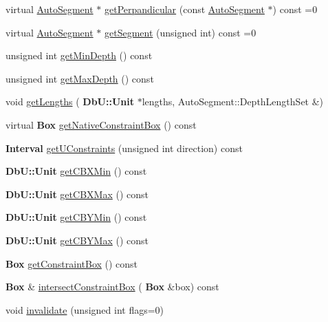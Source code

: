 \begin{DoxyCompactItemize}
\item 
virtual \hyperlink{classKatabatic_1_1AutoSegment}{Auto\+Segment} $\ast$ \hyperlink{classKatabatic_1_1AutoContact_a994371005874f946cc0ac78005d38423}{get\+Perpandicular} (const \hyperlink{classKatabatic_1_1AutoSegment}{Auto\+Segment} $\ast$) const =0
\item 
virtual \hyperlink{classKatabatic_1_1AutoSegment}{Auto\+Segment} $\ast$ \hyperlink{classKatabatic_1_1AutoContact_a50531ded68cc5206fe104b8d8bf3bd87}{get\+Segment} (unsigned int) const =0
\item 
unsigned int \hyperlink{classKatabatic_1_1AutoContact_ada381cbb88211a7f63d30691b669b5e1}{get\+Min\+Depth} () const
\item 
unsigned int \hyperlink{classKatabatic_1_1AutoContact_ac350bb9d2d038287530fcf474987ba55}{get\+Max\+Depth} () const
\item 
void \hyperlink{classKatabatic_1_1AutoContact_ac607a624c0698056c5bccf405cf05ea7}{get\+Lengths} (\textbf{ Db\+U\+::\+Unit} $\ast$lengths, Auto\+Segment\+::\+Depth\+Length\+Set \&)
\item 
virtual \textbf{ Box} \hyperlink{classKatabatic_1_1AutoContact_a00ed934305dd186a284b7a13b5798cb6}{get\+Native\+Constraint\+Box} () const
\item 
\textbf{ Interval} \hyperlink{classKatabatic_1_1AutoContact_ab1fd3fec6dd56d40217b8a5ecacb1719}{get\+U\+Constraints} (unsigned int direction) const
\item 
\textbf{ Db\+U\+::\+Unit} \hyperlink{classKatabatic_1_1AutoContact_a347244bd3f3a59881a2dee9801c74618}{get\+C\+B\+X\+Min} () const
\item 
\textbf{ Db\+U\+::\+Unit} \hyperlink{classKatabatic_1_1AutoContact_a798750f964050c53c269a2e56d44b690}{get\+C\+B\+X\+Max} () const
\item 
\textbf{ Db\+U\+::\+Unit} \hyperlink{classKatabatic_1_1AutoContact_ad7ee1befb03ee85f237a36e2f5ab8e45}{get\+C\+B\+Y\+Min} () const
\item 
\textbf{ Db\+U\+::\+Unit} \hyperlink{classKatabatic_1_1AutoContact_a4e4061a17285b0c08c31cfee65947cb6}{get\+C\+B\+Y\+Max} () const
\item 
\textbf{ Box} \hyperlink{classKatabatic_1_1AutoContact_ae9d087a6cd3d459d7f4bea6bc8b08b49}{get\+Constraint\+Box} () const
\item 
\textbf{ Box} \& \hyperlink{classKatabatic_1_1AutoContact_ac2fe070a286356a24baa466b4fe5b74d}{intersect\+Constraint\+Box} (\textbf{ Box} \&box) const
\item 
void \hyperlink{classKatabatic_1_1AutoContact_aabac50fd9b8e1bba7289573973658d18}{invalidate} (unsigned int flags=0)

\end{DoxyCompactItemize}
